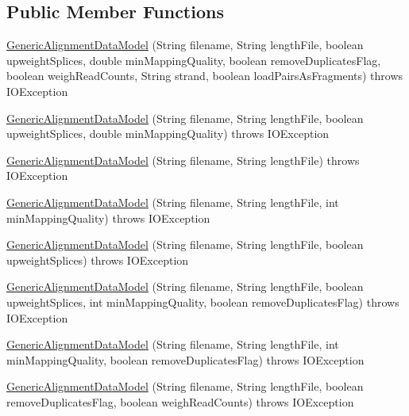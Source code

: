 \subsection*{Public Member Functions}
\begin{DoxyCompactItemize}
\item 
\hyperlink{classbroad_1_1pda_1_1seq_1_1segmentation_1_1_generic_alignment_data_model_a30b218ffe2c70e0bdfd2b45de8fc3488}{Generic\+Alignment\+Data\+Model} (String filename, String length\+File, boolean upweight\+Splices, double min\+Mapping\+Quality, boolean remove\+Duplicates\+Flag, boolean weigh\+Read\+Counts, String strand, boolean load\+Pairs\+As\+Fragments)  throws I\+O\+Exception
\item 
\hyperlink{classbroad_1_1pda_1_1seq_1_1segmentation_1_1_generic_alignment_data_model_a1bebfb4c118c9a69e2ba56bb14c7d618}{Generic\+Alignment\+Data\+Model} (String filename, String length\+File, boolean upweight\+Splices, double min\+Mapping\+Quality)  throws I\+O\+Exception 
\item 
\hyperlink{classbroad_1_1pda_1_1seq_1_1segmentation_1_1_generic_alignment_data_model_a9ca34700cabbaa3686e62cf37036dcdc}{Generic\+Alignment\+Data\+Model} (String filename, String length\+File)  throws I\+O\+Exception
\item 
\hyperlink{classbroad_1_1pda_1_1seq_1_1segmentation_1_1_generic_alignment_data_model_a50aa57688bb19188b77755c54cc1f8a5}{Generic\+Alignment\+Data\+Model} (String filename, String length\+File, int min\+Mapping\+Quality)  throws I\+O\+Exception
\item 
\hyperlink{classbroad_1_1pda_1_1seq_1_1segmentation_1_1_generic_alignment_data_model_acdae4c4c918d464beabb81dbdbefb5e1}{Generic\+Alignment\+Data\+Model} (String filename, String length\+File, boolean upweight\+Splices)  throws I\+O\+Exception
\item 
\hyperlink{classbroad_1_1pda_1_1seq_1_1segmentation_1_1_generic_alignment_data_model_a52ecfee3e2f26fd09ad3900f2fdd2e34}{Generic\+Alignment\+Data\+Model} (String filename, String length\+File, boolean upweight\+Splices, int min\+Mapping\+Quality, boolean remove\+Duplicates\+Flag)  throws I\+O\+Exception
\item 
\hyperlink{classbroad_1_1pda_1_1seq_1_1segmentation_1_1_generic_alignment_data_model_af7fda420f4bea42ab1fb0b1063a75b48}{Generic\+Alignment\+Data\+Model} (String filename, String length\+File, int min\+Mapping\+Quality, boolean remove\+Duplicates\+Flag)  throws I\+O\+Exception
\item 
\hyperlink{classbroad_1_1pda_1_1seq_1_1segmentation_1_1_generic_alignment_data_model_a9db56d4a5f753f4819e3fc7806bb6de2}{Generic\+Alignment\+Data\+Model} (String filename, String length\+File, boolean remove\+Duplicates\+Flag, boolean weigh\+Read\+Counts)  throws I\+O\+Exception

\end{DoxyCompactItemize}
